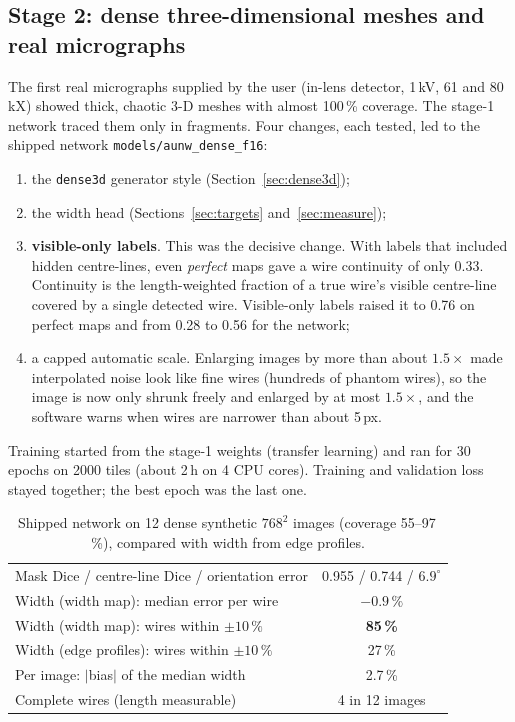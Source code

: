 \documentclass[11pt,a4paper]{article}
\newcommand{\code}[1]{\texttt{#1}}
\begin{document}
\subsection{Stage 2: dense three-dimensional meshes and real micrographs}\label{sec:dense}
The first real micrographs supplied by the user (in-lens detector, 1\,kV, 61 and 80\,kX) showed thick, chaotic 3-D meshes with almost 100\,\% coverage. The stage-1 network traced them only in fragments. Four changes, each tested, led to the shipped network \code{models/aunw\_dense\_f16}:
\begin{enumerate}[leftmargin=*,itemsep=1pt]
\item the \code{dense3d} generator style (Section~\ref{sec:dense3d});
\item the width head (Sections~\ref{sec:targets} and~\ref{sec:measure});
\item \textbf{visible-only labels}. This was the decisive change. With labels that included hidden centre-lines, even \emph{perfect} maps gave a wire continuity of only 0.33. Continuity is the length-weighted fraction of a true wire's visible centre-line covered by a single detected wire. Visible-only labels raised it to 0.76 on perfect maps and from 0.28 to 0.56 for the network;
\item a capped automatic scale. Enlarging images by more than about $1.5\times$ made interpolated noise look like fine wires (hundreds of phantom wires), so the image is now only shrunk freely and enlarged by at most $1.5\times$, and the software warns when wires are narrower than about 5\,px.
\end{enumerate}
Training started from the stage-1 weights (transfer learning) and ran for 30 epochs on 2000 tiles (about 2\,h on 4 CPU cores). Training and validation loss stayed together; the best epoch was the last one.

\begin{table}[H]\centering\small
\caption{Shipped network on 12 dense synthetic $768^2$ images (coverage 55--97\,\%), compared with width from edge profiles.}\label{tab:dense}
\begin{tabular}{@{}lc@{}}\toprule
Mask Dice / centre-line Dice / orientation error & 0.955 / 0.744 / $6.9^\circ$ \\
Width (width map): median error per wire & $-0.9\,\%$ \\
Width (width map): wires within $\pm10\,\%$ & \textbf{85\,\%} \\
Width (edge profiles): wires within $\pm10\,\%$ & 27\,\% \\
Per image: $|$bias$|$ of the median width & 2.7\,\% \\
Complete wires (length measurable) & 4 in 12 images \\\bottomrule
\end{tabular}
\end{table}
\end{document}
